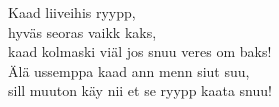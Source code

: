 
Kaad liiveihis ryypp, \\ hyväs seoras vaikk kaks, \\ kaad kolmaski viäl jos snuu veres om baks! \\ Älä ussemppa kaad ann menn siut suu, \\ sill muuton käy nii et se ryypp kaata snuu!